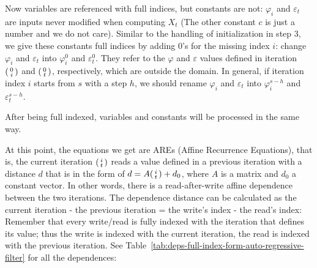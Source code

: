 Now variables are referenced with full indices, but constants are not: $\varphi_i$ and $\varepsilon_t$ are inputs never modified when computing $X_t$ (The other constant $c$ is just a number and we do not care). Similar to the handling of initialization in step 3, we give these constants full indices by adding 0's for the missing index $i$:  change $\varphi_i$ and $\varepsilon_t$  into $\varphi_i^0$ and $\varepsilon_t^0$. They refer to the $\varphi$ and $\varepsilon$ values defined in iteration $\begin{psmallmatrix}0\\i\end{psmallmatrix}$ and $\begin{psmallmatrix}0\\t\end{psmallmatrix}$, respectively,  which are outside the domain. In general, if iteration index $i$ starts from $s$ with a step $h$, we should rename $\varphi_i$ and $\varepsilon_t$ into $\varphi_i^{s-h}$ and $\varepsilon_t^{s-h}$.

After being full indexed, variables and constants will be processed in the same way.

At this point, the equations we get are AREs (Affine Recurrence Equations), that is, the current iteration $\begin{psmallmatrix}i\\t\end{psmallmatrix}$ reads a value defined in a previous iteration with a distance $d$ that is in the form of  $d=A\begin{psmallmatrix}i\\t\end{psmallmatrix}+d_0$, where $A$ is a matrix and $d_0$ a constant vector. In other words, there is a read-after-write affine dependence between the two iterations. The dependence distance can be calculated as the current iteration  - the previous iteration  = the write's index - the read's index: Remember that every write/read is fully indexed with the iteration that defines its value; thus the write is indexed with the current iteration, the read is indexed with the previous iteration.  See Table~\ref{tab:deps-full-index-form-auto-regressive-filter} for all the dependences:

